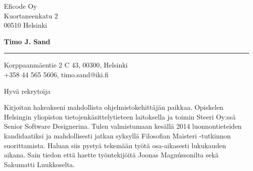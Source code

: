 \documentclass{letter} %
\begin{document}
\signature{Timo J. Sand}           %
\longindentation=0pt                       %
\let\raggedleft\raggedright                %


\begin{letter}{%
 Eficode Oy \\
Kuortaneenkatu 2 \\
00510 Helsinki
}

\begin{flushleft}
{\large\bf Timo J. Sand}
\end{flushleft}
\medskip\hrule height 1pt
\begin{flushright}
\hfill Korppaanmäentie 2 C 43, 00300, Helsinki \\
\hfill +358 44 565 5606, timo.sand@iki.fi
\end{flushright}
\vfill %


\opening{Hyvä rekrytoija}


\noindent
Kirjoitan hakeakseni mahdollista ohjelmistokehittäjän paikkaa.
Opiskelen Helsingin yliopiston tietojenkäsittelytieteen laitoksella ja toimin Steeri Oy:ssä Senior Software Designerina. Tulen valmistumaan kesällä 2014 luonnontieteiden kandidaatiksi ja mahdollisesti jatkan syksyllä Filosofian Maisteri -tutkinnon suorittamista. Haluan siis pystyä tekemään työtä osa-aikasesti lukukauden aikana. Sain tiedon että haette työntekijöitä Joonas Magnússonilta sekä Sakumatti Luukkoselta.


\noindent


\end{letter}
\end{document}
